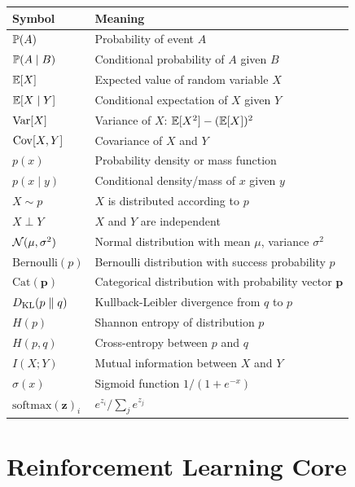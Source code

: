 \begin{center}
\begin{tabular}{@{}ll@{}}
\toprule
\textbf{Symbol} & \textbf{Meaning} \\
\midrule
$\mathbb{P}(A)$          & Probability of event $A$ \\
$\mathbb{P}(A\mid B)$    & Conditional probability of $A$ given $B$ \\
$\operatorname{\mathbb{E}}[X]$             & Expected value of random variable $X$ \\
$\operatorname{\mathbb{E}}[X \mid Y]$      & Conditional expectation of $X$ given $Y$ \\
$\operatorname{Var}[X]$           & Variance of $X$: $\operatorname{\mathbb{E}}[X^2]-(\operatorname{\mathbb{E}}[X])^2$ \\
$\operatorname{Cov}[X,Y]$         & Covariance of $X$ and $Y$ \\
$p(x)$              & Probability density or mass function \\
$p(x \mid y)$       & Conditional density/mass of $x$ given $y$ \\
$X \sim p$          & $X$ is distributed according to $p$ \\
$X \perp Y$         & $X$ and $Y$ are independent \\
$\mathcal{N}(\mu,\sigma^2)$ & Normal distribution with mean $\mu$, variance $\sigma^2$ \\
$\mathrm{Bernoulli}(p)$ & Bernoulli distribution with success probability $p$ \\
$\mathrm{Cat}(\mathbf{p})$ & Categorical distribution with probability vector $\mathbf{p}$ \\
$D_{\mathrm{KL}}\!\left(p\;\|\;q\right)$         & Kullback-Leibler divergence from $q$ to $p$ \\
$H(p)$              & Shannon entropy of distribution $p$ \\
$H(p,q)$            & Cross-entropy between $p$ and $q$ \\
$I(X;Y)$            & Mutual information between $X$ and $Y$ \\
$\sigma(x)$         & Sigmoid function $1/(1+e^{-x})$ \\
$\mathrm{softmax}(\mathbf{z})_i$ & $e^{z_i}/\sum_j e^{z_j}$ \\
\bottomrule
\end{tabular}
\end{center}

\section*{Reinforcement Learning Core}

